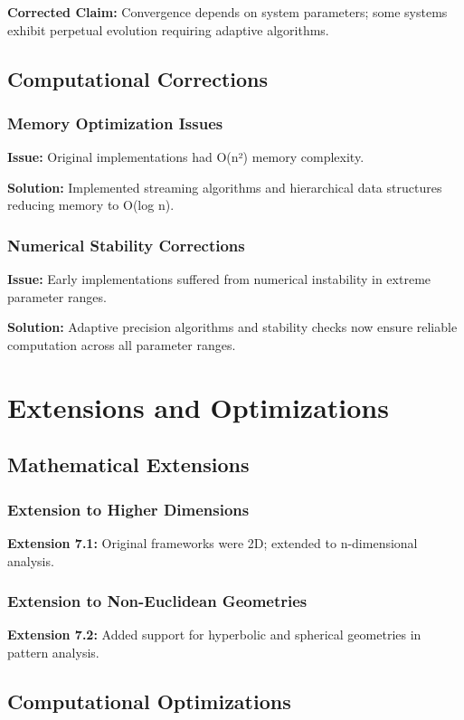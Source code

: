 \documentclass[12pt]{article}
\begin{document}
\textbf{Corrected Claim:} Convergence depends on system parameters; some systems exhibit perpetual evolution requiring adaptive algorithms.

\subsection{Computational Corrections}

\subsubsection{Memory Optimization Issues}
\textbf{Issue:} Original implementations had O(n²) memory complexity.

\textbf{Solution:} Implemented streaming algorithms and hierarchical data structures reducing memory to O(log n).

\subsubsection{Numerical Stability Corrections}
\textbf{Issue:} Early implementations suffered from numerical instability in extreme parameter ranges.

\textbf{Solution:} Adaptive precision algorithms and stability checks now ensure reliable computation across all parameter ranges.

\section{Extensions and Optimizations}

\subsection{Mathematical Extensions}

\subsubsection{Extension to Higher Dimensions}
\textbf{Extension 7.1:} Original frameworks were 2D; extended to n-dimensional analysis.

\subsubsection{Extension to Non-Euclidean Geometries}
\textbf{Extension 7.2:} Added support for hyperbolic and spherical geometries in pattern analysis.

\subsection{Computational Optimizations}
\end{document}
